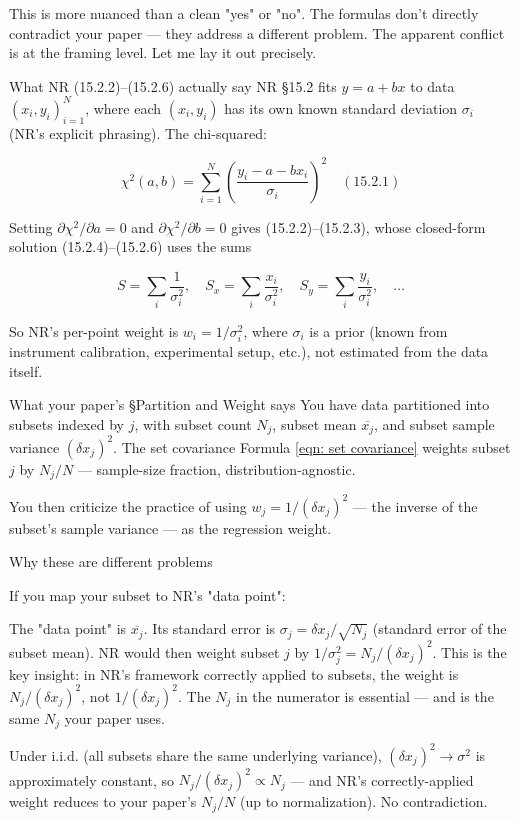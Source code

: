 \documentclass[twoside]{article}
\numberwithin{equation}{section}
\begin{document}
This is more nuanced than a clean "yes" or "no". The formulas don't directly contradict your paper — they address a different problem. The apparent conflict is at the framing level. Let me lay it out precisely.

What NR (15.2.2)–(15.2.6) actually say
NR §15.2 fits $y = a + bx$ to data ${(x_i, y_i)}_{i=1}^N$, where each $(x_i, y_i)$ has its own known standard deviation $\sigma_i$ (NR's explicit phrasing). The chi-squared:

$$\chi^2(a, b) = \sum_{i=1}^N \left(\frac{y_i - a - bx_i}{\sigma_i}\right)^2 \quad (15.2.1)$$

Setting $\partial\chi^2/\partial a = 0$ and $\partial\chi^2/\partial b = 0$ gives (15.2.2)–(15.2.3), whose closed-form solution (15.2.4)–(15.2.6) uses the sums

$$S = \sum_i \frac{1}{\sigma_i^2}, \quad S_x = \sum_i \frac{x_i}{\sigma_i^2}, \quad S_y = \sum_i \frac{y_i}{\sigma_i^2}, \quad \dots$$

So NR's per-point weight is $w_i = 1/\sigma_i^2$, where $\sigma_i$ is a prior (known from instrument calibration, experimental setup, etc.), not estimated from the data itself.

What your paper's §Partition and Weight says
You have data partitioned into subsets indexed by $j$, with subset count $N_j$, subset mean $\overline{x_j}$, and subset sample variance $(\delta x_j)^2$. The set covariance Formula \eqref{eqn: set covariance} weights subset $j$ by $N_j/N$ — sample-size fraction, distribution-agnostic.

You then criticize the practice of using $w_j = 1/(\delta x_j)^2$ — the inverse of the subset's sample variance — as the regression weight.

Why these are different problems

If you map your subset to NR's "data point":

The "data point" is $\overline{x_j}$.
Its standard error is $\sigma_j = \delta x_j / \sqrt{N_j}$ (standard error of the subset mean).
NR would then weight subset $j$ by $1/\sigma_j^2 = N_j / (\delta x_j)^2$.
This is the key insight: in NR's framework correctly applied to subsets, the weight is $N_j/(\delta x_j)^2$, not $1/(\delta x_j)^2$. The $N_j$ in the numerator is essential — and is the same $N_j$ your paper uses.

Under i.i.d. (all subsets share the same underlying variance), $(\delta x_j)^2 \to \sigma^2$ is approximately constant, so $N_j/(\delta x_j)^2 \propto N_j$ — and NR's correctly-applied weight reduces to your paper's $N_j/N$ (up to normalization). No contradiction.
\end{document}
